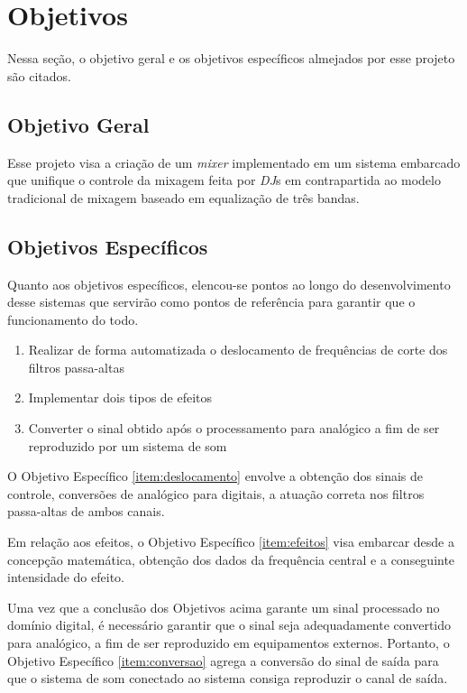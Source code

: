 \section{Objetivos}

Nessa seção, o objetivo geral e os objetivos específicos almejados por esse projeto são citados.

\subsection{Objetivo Geral}
Esse projeto visa a criação de um \textit{mixer} implementado em um sistema embarcado que unifique o controle da mixagem feita por \textit{DJ}s em contrapartida ao modelo tradicional de mixagem baseado em equalização de três bandas.

\subsection{Objetivos Específicos}

Quanto aos objetivos específicos, elencou-se pontos ao longo do desenvolvimento desse sistemas que servirão como pontos de referência para garantir que o funcionamento do todo. 

\begin{enumerate}
    \item \label{item:deslocamento} Realizar de forma automatizada o deslocamento de frequências de corte dos filtros passa-altas
    \item \label{item:efeitos} Implementar dois tipos de efeitos
    \item \label{item:conversao} Converter o sinal obtido após o processamento para analógico a fim de ser reproduzido por um sistema de som
\end{enumerate}

O Objetivo Específico \ref{item:deslocamento} envolve a obtenção dos sinais de controle, conversões de analógico para digitais, a atuação correta nos filtros passa-altas de ambos canais.

Em relação aos efeitos, o Objetivo Específico \ref{item:efeitos} visa embarcar desde a concepção matemática, obtenção dos dados da frequência central e a conseguinte intensidade do efeito. 

Uma vez que a conclusão dos Objetivos acima garante um sinal processado no domínio digital, é necessário garantir que o sinal seja adequadamente convertido para analógico, a fim de ser reproduzido em equipamentos externos. Portanto, o Objetivo Específico \ref{item:conversao} agrega a conversão do sinal de saída para que o sistema de som conectado ao sistema consiga reproduzir o canal de saída.

